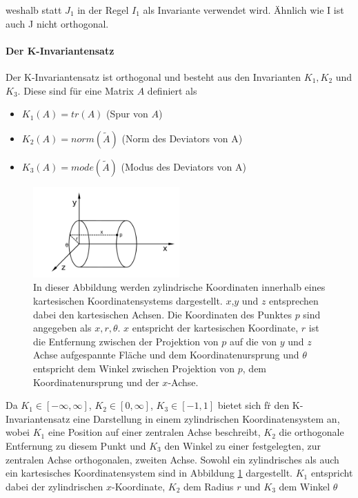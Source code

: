 \documentclass[a4paper,fontsize=12pt,toc=bib,halfparskip]{scrartcl}
\begin{document}
weshalb statt $J_1$ in der Regel $I_1$ als Invariante verwendet wird. \"Ahnlich wie I ist auch J nicht orthogonal.

\paragraph{Der K-Invariantensatz}
Der K-Invariantensatz ist orthogonal und besteht aus den Invarianten $K_1, K_2$ und $K_3$. Diese sind f\"ur eine Matrix $A$ definiert als

\begin{itemize}
	\item $K_1(A)=tr(A)$ (Spur von $A$)
	\item $K_2(A)=norm(\tilde{A})$ (Norm des Deviators von A)
	\item $K_3(A)=mode(\tilde{A})$ (Modus des Deviators von A)
\end{itemize}


\begin{figure}
	\centering
	\label{cylinderCoords}
	\includegraphics[width=0.5\textwidth]{pictures/cylinder}
	\caption{In dieser Abbildung werden zylindrische Koordinaten innerhalb eines kartesischen Koordinatensystems dargestellt. $x$,$y$ und $z$ entsprechen dabei den kartesischen Achsen. Die Koordinaten des Punktes $p$ sind angegeben als $x, r, \theta$. $x$ entspricht der kartesischen Koordinate, $r$ ist die Entfernung zwischen der Projektion von $p$ auf die von $y$ und $z$ Achse aufgespannte Fl\"ache und dem Koordinatenursprung und $\theta$ entspricht dem Winkel zwischen Projektion von $p$, dem Koordinatenursprung und der $x$-Achse. }
\end{figure}

Da $K_1 \in [-\infty, \infty]$, $K_2 \in [0,\infty]$, $K_3 \in [-1,1]$ bietet sich f\"r den K-Invariantensatz eine Darstellung in einem zylindrischen Koordinatensystem an, wobei $K_1$ eine Position auf einer zentralen Achse beschreibt, $K_2$ die orthogonale Entfernung zu diesem Punkt und $K_3$ den Winkel zu einer festgelegten, zur zentralen Achse orthogonalen, zweiten Achse. Sowohl ein zylindrisches als auch ein kartesisches Koordinatensystem sind in Abbildung \ref{cylinderCoords} dargestellt. $K_1$ entspricht dabei der zylindrischen $x$-Koordinate, $K_2$ dem Radius $r$ und $K_3$ dem Winkel $\theta$
\end{document}
